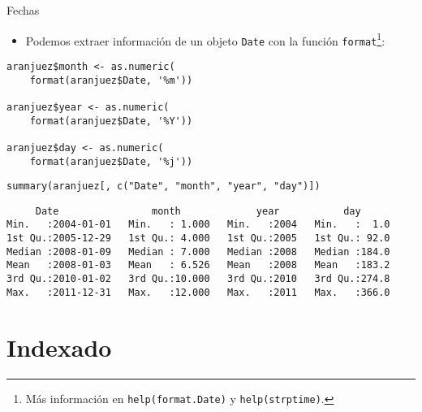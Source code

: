 \documentclass[xcolor={usenames,svgnames,dvipsnames}]{beamer}
\begin{document}
\begin{frame}[label={sec:org8640562},fragile]{Fechas}
 \begin{itemize}
\item Podemos extraer información de un objeto \texttt{Date} con la función \texttt{format}\footnote{Más información en \texttt{help(format.Date)} y \texttt{help(strptime)}.}:
\end{itemize}
\lstset{language=r,label= ,caption= ,captionpos=b,numbers=none}
\begin{lstlisting}
aranjuez$month <- as.numeric(
    format(aranjuez$Date, '%m'))

aranjuez$year <- as.numeric(
    format(aranjuez$Date, '%Y'))

aranjuez$day <- as.numeric(
    format(aranjuez$Date, '%j'))
\end{lstlisting}

\lstset{language=r,label= ,caption= ,captionpos=b,numbers=none}
\begin{lstlisting}
summary(aranjuez[, c("Date", "month", "year", "day")])
\end{lstlisting}

\begin{verbatim}
     Date                month             year           day       
Min.   :2004-01-01   Min.   : 1.000   Min.   :2004   Min.   :  1.0  
1st Qu.:2005-12-29   1st Qu.: 4.000   1st Qu.:2005   1st Qu.: 92.0  
Median :2008-01-09   Median : 7.000   Median :2008   Median :184.0  
Mean   :2008-01-03   Mean   : 6.526   Mean   :2008   Mean   :183.2  
3rd Qu.:2010-01-02   3rd Qu.:10.000   3rd Qu.:2010   3rd Qu.:274.8  
Max.   :2011-12-31   Max.   :12.000   Max.   :2011   Max.   :366.0
\end{verbatim}
\end{frame}

\section{Indexado}
\label{sec:org0331173}
\end{document}
